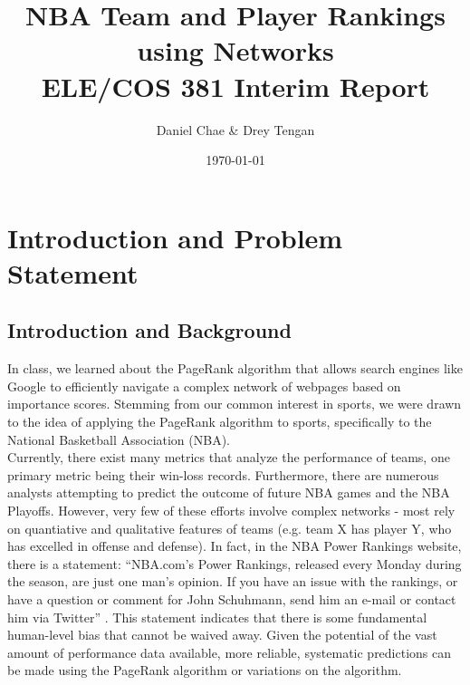 \documentclass[12pt]{article}%
\begin{document}
\title{NBA Team and Player Rankings using Networks\\
\vspace{3 mm}
\large ELE/COS 381 Interim Report}
\author{Daniel Chae \& Drey Tengan}
\date{\today}
\maketitle

\tableofcontents
\newpage
\section{Introduction and Problem Statement}
\subsection{Introduction and Background}
\null\quad\quad In class, we learned about the PageRank algorithm \cite{PageRank} that allows search engines like Google to efficiently navigate a complex network of webpages based on importance scores. Stemming from our common interest in sports, we were drawn to the idea of applying the PageRank algorithm to sports, specifically to the National Basketball Association (NBA).\\
\null\quad\quad Currently, there exist many metrics that analyze the performance of teams, one primary metric being their win-loss records. Furthermore, there are numerous analysts attempting to predict the outcome of future NBA games and the NBA Playoffs. However, very few of these efforts involve complex networks - most rely on quantiative and qualitative features of teams (e.g. team X has player Y, who has excelled in offense and defense). In fact, in the NBA Power Rankings website, there is a statement: ``NBA.com's Power Rankings, released every Monday during the season, are just one man's opinion. If you have an issue with the rankings, or have a question or comment for John Schuhmann, send him an e-mail or contact him via Twitter'' \cite{nbapowerrating}. This statement indicates that there is some fundamental human-level bias that cannot be waived away. Given the potential of the vast amount of performance data available, more reliable, systematic predictions can be made using the PageRank algorithm or variations on the algorithm.\\
\end{document}
